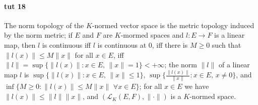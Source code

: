 \documentclass[a4paper]{article}
\newcommand{\Lcal}{\mathcal{L}}
\begin{document}


\paragraph{tut 18} %
\label{par:tut_18}

The norm topology of the $K$-normed vector space is the metric topology induced by the norm metric;
if $E$ and $F$ are $K$-mormed spaces and $l\colon E \to F$ is a linear map, then $l$ is continuous iff $l$ is continuous at $0$, iff there is $M\geq 0$ such that $\|l(x)\| \leq M \|x\|$ for all $x\in E$, iff $\|l\| = \sup\{\|l(x)\|\colon x\in E,\, \|x\|=1\} < +\infty$;
the norm $\|l\|$ of a linear map $l$ is $\sup\{\|l(x)\|\colon x\in E,\, \|x\| \leq 1\}$, $\sup\{\tfrac{\|l(x)\|}{\|x\|} \colon x\in E,\, x\neq 0\}$, and $\inf\{M\geq 0\colon \|l(x)\| \leq M \|x\|\,\,\forall{x\in E} \}$;
for all $x\in E$ we have $\|l(x)\| \leq \|l\| \|x\|$, and $(\Lcal_K(E, F), \|\cdot\|)$ is a $K$-normed space.
\end{document}
